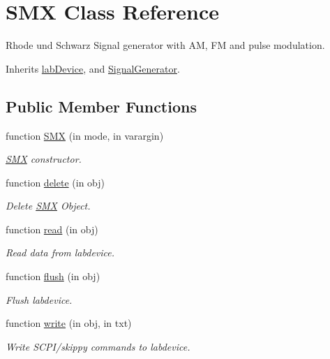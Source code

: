 \hypertarget{class_s_m_x}{}\section{S\+MX Class Reference}
\label{class_s_m_x}


Rhode und Schwarz Signal generator with AM, FM and pulse modulation.  




Inherits \hyperlink{classlab_device}{lab\+Device}, and \hyperlink{class_signal_generator}{Signal\+Generator}.

\subsection*{Public Member Functions}
\begin{DoxyCompactItemize}
\item 
function \hyperlink{class_s_m_x_ade343b92e0901e72f0718f18bfbbb867}{S\+MX} (in mode, in varargin)
\begin{DoxyCompactList}\small\item\em \hyperlink{class_s_m_x}{S\+MX} constructor. \end{DoxyCompactList}\item 
function \hyperlink{class_s_m_x_ab223e7b43c5813ce3b9ac735a3f37386}{delete} (in obj)
\begin{DoxyCompactList}\small\item\em Delete \hyperlink{class_s_m_x}{S\+MX} Object. \end{DoxyCompactList}\item 
function \hyperlink{class_s_m_x_aaa694a47ebbbbeb3200224181ee1d65b}{read} (in obj)
\begin{DoxyCompactList}\small\item\em Read data from labdevice. \end{DoxyCompactList}\item 
function \hyperlink{class_s_m_x_ab6a7febf2f8a2baecec1f66946b67845}{flush} (in obj)
\begin{DoxyCompactList}\small\item\em Flush labdevice. \end{DoxyCompactList}\item 
function \hyperlink{class_s_m_x_a28e9a0da57a9a3ba7fe66dc9b0f00596}{write} (in obj, in txt)
\begin{DoxyCompactList}\small\item\em Write S\+C\+P\+I/skippy commands to labdevice. \end{DoxyCompactList}\item 

\end{DoxyCompactItemize}
